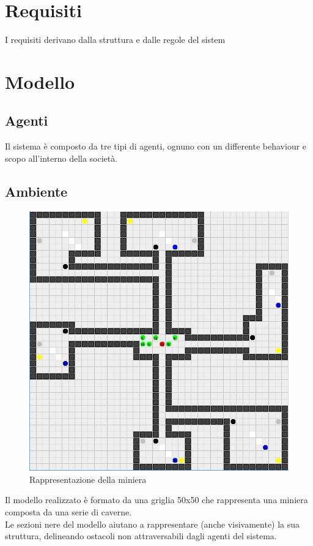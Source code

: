 \documentclass{llncs}
\newcommand{\labelsec}[1]{\label{sec:#1}}
\begin{document}
\section{Requisiti}
I requisiti derivano dalla struttura e dalle regole del sistem
\newpage
\section{Modello}
\labelsec{Modello}
\subsection{Agenti}
Il sistema è composto da tre tipi di agenti, ognuno con un differente behaviour e scopo all'interno della società.
\newpage
\subsection{Ambiente}
\begin{figure}[htbp]
  \centering
   \includegraphics[scale = 0.55]{img/miniera.png}
  \caption{Rappresentazione della miniera}
\end{figure}
Il modello realizzato è formato da una griglia 50x50 che rappresenta una miniera composta da una serie di caverne.\\
Le sezioni nere del modello aiutano a rappresentare (anche visivamente) la sua struttura, delineando ostacoli non attraversabili dagli agenti del sistema.\\
\end{document}
